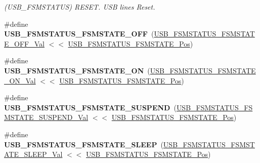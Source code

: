 \begin{DoxyCompactItemize}
\begin{DoxyCompactList}\small\item\em (U\+S\+B\+\_\+\+F\+S\+M\+S\+T\+A\+T\+U\+S) R\+E\+S\+E\+T. U\+S\+B lines Reset. \end{DoxyCompactList}\item 
\hypertarget{group___s_a_m_l21___u_s_b_ga6dd1b1bd5b1d8462e0b087941768178e}{}\#define {\bfseries U\+S\+B\+\_\+\+F\+S\+M\+S\+T\+A\+T\+U\+S\+\_\+\+F\+S\+M\+S\+T\+A\+T\+E\+\_\+\+O\+F\+F}~(\hyperlink{group___s_a_m_l21___u_s_b_ga3b573bcca8d34cfbfb9c47640132e311}{U\+S\+B\+\_\+\+F\+S\+M\+S\+T\+A\+T\+U\+S\+\_\+\+F\+S\+M\+S\+T\+A\+T\+E\+\_\+\+O\+F\+F\+\_\+\+Val} $<$$<$ \hyperlink{group___s_a_m_l21___u_s_b_ga1584eb0083050e0e37701f538d71c143}{U\+S\+B\+\_\+\+F\+S\+M\+S\+T\+A\+T\+U\+S\+\_\+\+F\+S\+M\+S\+T\+A\+T\+E\+\_\+\+Pos})\label{group___s_a_m_l21___u_s_b_ga6dd1b1bd5b1d8462e0b087941768178e}

\item 
\hypertarget{group___s_a_m_l21___u_s_b_ga26143d67c4097c6eb2f9ae47fe9ccff4}{}\#define {\bfseries U\+S\+B\+\_\+\+F\+S\+M\+S\+T\+A\+T\+U\+S\+\_\+\+F\+S\+M\+S\+T\+A\+T\+E\+\_\+\+O\+N}~(\hyperlink{group___s_a_m_l21___u_s_b_gaf34bb78c6900252526f038e131f70312}{U\+S\+B\+\_\+\+F\+S\+M\+S\+T\+A\+T\+U\+S\+\_\+\+F\+S\+M\+S\+T\+A\+T\+E\+\_\+\+O\+N\+\_\+\+Val} $<$$<$ \hyperlink{group___s_a_m_l21___u_s_b_ga1584eb0083050e0e37701f538d71c143}{U\+S\+B\+\_\+\+F\+S\+M\+S\+T\+A\+T\+U\+S\+\_\+\+F\+S\+M\+S\+T\+A\+T\+E\+\_\+\+Pos})\label{group___s_a_m_l21___u_s_b_ga26143d67c4097c6eb2f9ae47fe9ccff4}

\item 
\hypertarget{group___s_a_m_l21___u_s_b_gaef5966cdf078f0d5224802615e17a4c1}{}\#define {\bfseries U\+S\+B\+\_\+\+F\+S\+M\+S\+T\+A\+T\+U\+S\+\_\+\+F\+S\+M\+S\+T\+A\+T\+E\+\_\+\+S\+U\+S\+P\+E\+N\+D}~(\hyperlink{group___s_a_m_l21___u_s_b_ga11570ce95d207d25017664abe9a39561}{U\+S\+B\+\_\+\+F\+S\+M\+S\+T\+A\+T\+U\+S\+\_\+\+F\+S\+M\+S\+T\+A\+T\+E\+\_\+\+S\+U\+S\+P\+E\+N\+D\+\_\+\+Val} $<$$<$ \hyperlink{group___s_a_m_l21___u_s_b_ga1584eb0083050e0e37701f538d71c143}{U\+S\+B\+\_\+\+F\+S\+M\+S\+T\+A\+T\+U\+S\+\_\+\+F\+S\+M\+S\+T\+A\+T\+E\+\_\+\+Pos})\label{group___s_a_m_l21___u_s_b_gaef5966cdf078f0d5224802615e17a4c1}

\item 
\hypertarget{group___s_a_m_l21___u_s_b_ga425d731206b89f172aed92f709f2f34d}{}\#define {\bfseries U\+S\+B\+\_\+\+F\+S\+M\+S\+T\+A\+T\+U\+S\+\_\+\+F\+S\+M\+S\+T\+A\+T\+E\+\_\+\+S\+L\+E\+E\+P}~(\hyperlink{group___s_a_m_l21___u_s_b_gad784f6462df68811e79b524c1e026e1e}{U\+S\+B\+\_\+\+F\+S\+M\+S\+T\+A\+T\+U\+S\+\_\+\+F\+S\+M\+S\+T\+A\+T\+E\+\_\+\+S\+L\+E\+E\+P\+\_\+\+Val} $<$$<$ \hyperlink{group___s_a_m_l21___u_s_b_ga1584eb0083050e0e37701f538d71c143}{U\+S\+B\+\_\+\+F\+S\+M\+S\+T\+A\+T\+U\+S\+\_\+\+F\+S\+M\+S\+T\+A\+T\+E\+\_\+\+Pos})\label{group___s_a_m_l21___u_s_b_ga425d731206b89f172aed92f709f2f34d}


\end{DoxyCompactItemize}
